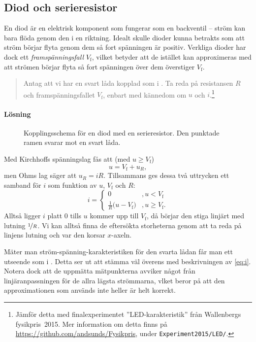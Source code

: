 \documentclass[11pt,a4paper, swedish
]{article}
\begin{document}
\subsection{Diod och serieresistor}
\newcommand{\Vf}{\ensuremath{}V_\text{f}}

En diod är en elektrisk komponent som fungerar som en backventil --
ström kan bara flöda genom den i en riktning. Idealt skulle dioder
kunna betrakts som att ström börjar flyta genom dem så fort spänningen
är positiv. 
Verkliga dioder har dock ett \emph{framspänningsfall} $\Vf$,
vilket betyder att de istället kan approximeras med att strömen börjar
flyta så fort spänningen över dem överstiger $\Vf$.
\begin{quote}
Antag att vi har en svart låda kopplad som i
.
Ta reda på resistansen $R$ och framspänningsfallet
$\Vf$, enbart med kännedom om $u$ och $i$.\footnote{Jämför
  detta med finalexperimentet ''LED-karakteristik'' från Wallenbergs
  fysikpris~2015. Mer information om detta finns på 
  \url{https://github.com/andsunds/Fysikpris}, under
  \texttt{Experiment2015/LED/}. } 
\end{quote}

\paragraph{Lösning}
\begin{figure}
\centering

\caption{Kopplingsschema för en diod med en serieresistor. Den
  punktade ramen svarar mot en svart låda.}
\label{fig:LED_schematics}
\end{figure}
Med Kirchhoffs spänningslag fås att (med $u\ge\Vf$)
\begin{equation}
u=\Vf+u_R,
\end{equation}
men Ohms lag säger att $u_R=iR$. Tillsammans ges dessa två uttrycken
ett samband för $i$ som funktion av $u$, $\Vf$ och $R$:
\begin{equation}\label{eq:i}
i=\begin{cases}
0 &, u<\Vf\\
\frac{1}{R}\Big(u-\Vf\Big)&, u\ge\Vf.
\end{cases}
\end{equation}
Alltså ligger $i$ platt $0$ tills $u$ kommer upp till $\Vf$, då börjar den stiga
linjärt med lutning $\nicefrac{1}{R}$. Vi kan alltså finna de
eftersökta storheterna genom att ta reda på linjens lutning och var
den korsar $x$-axeln.

Mäter man ström-spänning-karakteristiken för den svarta lådan får man
ett utseende som i . Detta ser ut att stämma väl
överens med beskrivningen av \eqref{eq:i}. Notera dock att de
uppmätta mätpunkterna avviker något från linjäranpassningen för de
allra lägsta strömmarna, vlket beror på att den approximationen som
används inte heller är helt korrekt. 
\end{document}
